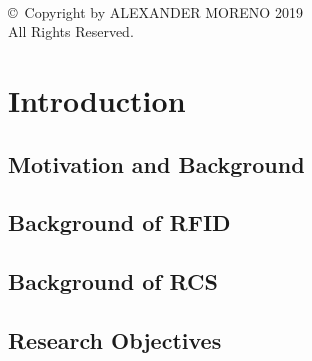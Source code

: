 \documentclass[12pt,onecolumn]{report}
\begin{document}
\newpage
\centering
\clearpage
~ \\
\vfill
\copyright~Copyright by ALEXANDER MORENO 2019 \\
All Rights Reserved.


\pagebreak
\justify
{}
\setcounter{page}{3}
\renewcommand{\contentsname}{Table of Contents}


\tableofcontents
\listoffigures

\newpage
\begin{abstract}
\thispagestyle{plain}
\setcounter{page}{9}
\end{abstract}

\clearpage
{}
\doublespacing

\chapter{Introduction}
    \section{Motivation and Background}
        
    \section{Background of RFID}
        
    \section{Background of RCS}
        
    \section{Research Objectives}
        
%        
        
\end{document}
